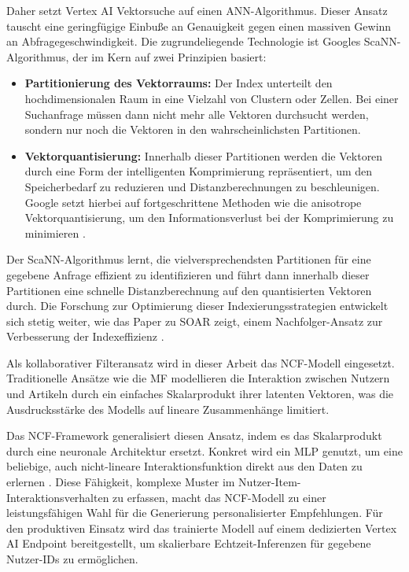 Daher setzt Vertex AI Vektorsuche auf einen \ac{ANN}-Algorithmus. 
Dieser Ansatz tauscht eine geringfügige Einbuße an Genauigkeit gegen einen massiven Gewinn an Abfragegeschwindigkeit. 
Die zugrundeliegende Technologie ist Googles \ac{ScaNN}-Algorithmus, der im Kern auf zwei Prinzipien basiert:

\begin{itemize}
    \item \textbf{Partitionierung des Vektorraums:} Der Index unterteilt den hochdimensionalen Raum in eine Vielzahl von Clustern oder Zellen. 
    Bei einer Suchanfrage müssen dann nicht mehr alle Vektoren durchsucht werden, sondern nur noch die Vektoren in den wahrscheinlichsten Partitionen.
    \item \textbf{Vektorquantisierung:} Innerhalb dieser Partitionen werden die Vektoren durch eine Form der intelligenten Komprimierung repräsentiert, 
    um den Speicherbedarf zu reduzieren und Distanzberechnungen zu beschleunigen. Google setzt hierbei auf fortgeschrittene Methoden wie die anisotrope 
    Vektorquantisierung, um den Informationsverlust bei der Komprimierung zu minimieren \cite{avq_2020}.
\end{itemize}

Der ScaNN-Algorithmus lernt, die vielversprechendsten Partitionen für eine gegebene Anfrage effizient zu identifizieren und führt dann innerhalb 
dieser Partitionen eine schnelle Distanzberechnung auf den quantisierten Vektoren durch. 
Die Forschung zur Optimierung dieser Indexierungsstrategien entwickelt sich stetig weiter, wie das Paper zu SOAR zeigt, 
einem Nachfolger-Ansatz zur Verbesserung der Indexeffizienz \cite{soar_2023}.

\label{sec:ncf_service}

Als kollaborativer Filteransatz wird in dieser Arbeit das \ac{NCF}-Modell eingesetzt. 
Traditionelle Ansätze wie die \ac{MF} modellieren die Interaktion zwischen Nutzern und Artikeln durch ein einfaches Skalarprodukt ihrer latenten Vektoren,
was die Ausdrucksstärke des Modells auf lineare Zusammenhänge limitiert.

Das NCF-Framework generalisiert diesen Ansatz, indem es das Skalarprodukt durch eine neuronale Architektur ersetzt. 
Konkret wird ein \ac{MLP} genutzt, um eine beliebige, auch nicht-lineare Interaktionsfunktion direkt aus den Daten zu erlernen \cite{he_neural_2017}. 
Diese Fähigkeit, komplexe Muster im Nutzer-Item-Interaktionsverhalten zu erfassen, macht das NCF-Modell zu einer 
leistungsfähigen Wahl für die Generierung personalisierter Empfehlungen.
Für den produktiven Einsatz wird das trainierte Modell auf einem dedizierten Vertex AI Endpoint bereitgestellt, 
um skalierbare Echtzeit-Inferenzen für gegebene Nutzer-IDs zu ermöglichen.

